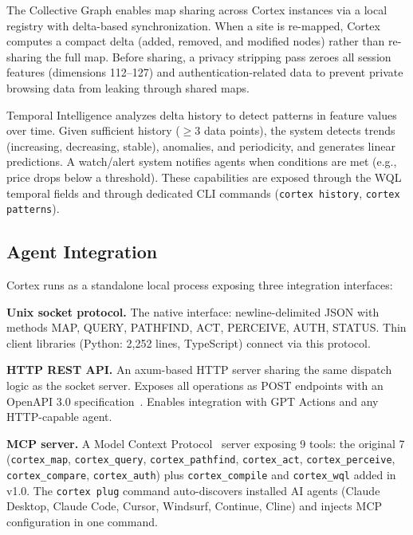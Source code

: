\documentclass[10pt, twocolumn]{article}
\begin{document}
The Collective Graph enables map sharing across Cortex instances via a local registry with delta-based synchronization. When a site is re-mapped, Cortex computes a compact delta (added, removed, and modified nodes) rather than re-sharing the full map. Before sharing, a privacy stripping pass zeroes all session features (dimensions 112--127) and authentication-related data to prevent private browsing data from leaking through shared maps.

Temporal Intelligence analyzes delta history to detect patterns in feature values over time. Given sufficient history ($\geq$3 data points), the system detects trends (increasing, decreasing, stable), anomalies, and periodicity, and generates linear predictions. A watch/alert system notifies agents when conditions are met (e.g., price drops below a threshold). These capabilities are exposed through the WQL temporal fields and through dedicated CLI commands (\texttt{cortex history}, \texttt{cortex patterns}).

\subsection{Agent Integration}
\label{sec:integration}

Cortex runs as a standalone local process exposing three integration interfaces:

\textbf{Unix socket protocol.} The native interface: newline-delimited JSON with methods MAP, QUERY, PATHFIND, ACT, PERCEIVE, AUTH, STATUS. Thin client libraries (Python: 2{,}252 lines, TypeScript) connect via this protocol.

\textbf{HTTP REST API.} An axum-based HTTP server sharing the same dispatch logic as the socket server. Exposes all operations as POST endpoints with an OpenAPI 3.0 specification~\cite{openapi2021}. Enables integration with GPT Actions and any HTTP-capable agent.

\textbf{MCP server.} A Model Context Protocol~\cite{mcp2024} server exposing 9 tools: the original 7 (\texttt{cortex\_map}, \texttt{cortex\_query}, \texttt{cortex\_pathfind}, \texttt{cortex\_act}, \texttt{cortex\_perceive}, \texttt{cortex\_compare}, \texttt{cortex\_auth}) plus \texttt{cortex\_compile} and \texttt{cortex\_wql} added in v1.0. The \texttt{cortex plug} command auto-discovers installed AI agents (Claude Desktop, Claude Code, Cursor, Windsurf, Continue, Cline) and injects MCP configuration in one command.
\end{document}
